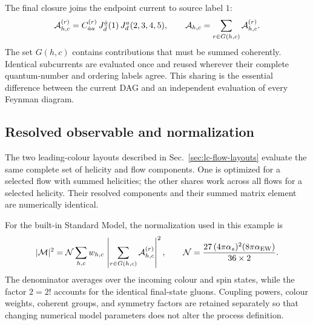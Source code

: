 The final closure joins the endpoint current to source label \(1\):
\begin{equation}
  {\cal A}_{h,c}^{(r)}
  =C^{(r)}_{\dot a a}\,
   J_{\bar d}^{\dot a}(1)\,
   J_d^a(2,3,4,5),
  \qquad
  {\cal A}_{h,c}=\sum_{r\in G(h,c)}{\cal A}_{h,c}^{(r)} .
  \label{eq:zgg-amplitude-root}
\end{equation}
The set \(G(h,c)\) contains contributions that must be summed coherently.
Identical subcurrents are evaluated once and reused wherever their complete
quantum-number and ordering labels agree.  This sharing is the essential
difference between the current DAG and an independent evaluation of every
Feynman diagram.

\subsection{Resolved observable and normalization}

The two leading-colour layouts described in
Sec.~\ref{sec:lc-flow-layouts} evaluate the same complete set of helicity and
flow components.  One is optimized for a selected flow with summed helicities;
the other shares work across all flows for a selected helicity.  Their resolved
components and their summed matrix element are numerically identical.

For the built-in Standard Model, the normalization used in this example is
\begin{equation}
  |{\cal M}|^2
  ={\cal N}\sum_{h,c}w_{h,c}\,
     \left|\sum_{r\in G(h,c)}{\cal A}_{h,c}^{(r)}\right|^2,
  \qquad
  {\cal N}=\frac{27\,(4\pi\alpha_s)^2(8\pi\alpha_{\rm EW})}
                  {36\times2}.
  \label{eq:zgg-normalization}
\end{equation}
The denominator averages over the incoming colour and spin states, while the
factor \(2=2!\) accounts for the identical final-state gluons.  Coupling
powers, colour weights, coherent groups, and symmetry factors are retained
separately so that changing numerical model parameters does not alter the
process definition.

